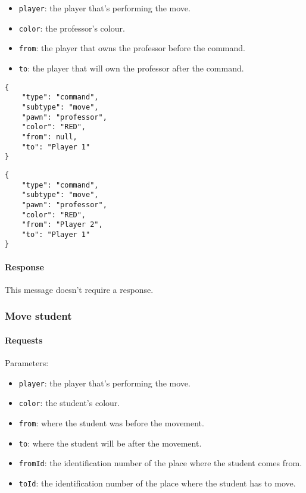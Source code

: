 \documentclass[a4paper]{article}
\begin{document}
	\begin{itemize}
		\item \verb|player|: the player that's performing the move.
		\item \verb|color|: the professor's colour.
		\item \verb|from|: the player that owns the professor before the command.
		\item \verb|to|: the player that will own the professor after the command.
	\end{itemize}

	\begin{multicols}{2}
		\begin{verbatim}
{
	"type": "command",
	"subtype": "move",
	"pawn": "professor",
	"color": "RED",
	"from": null,
	"to": "Player 1"
}
		\end{verbatim}

		\begin{verbatim}
{
	"type": "command",
	"subtype": "move",
	"pawn": "professor",
	"color": "RED",
	"from": "Player 2",
	"to": "Player 1"
}
		\end{verbatim}
	\end{multicols}

	\paragraph{Response} This message doesn't require a response.

	\subsubsection{Move student}

	\paragraph{Requests} Parameters:

	\begin{itemize}
		\item \verb|player|: the player that's performing the move.
		\item \verb|color|: the student's colour.
		\item \verb|from|: where the student was before the movement.
		\item \verb|to|: where the student will be after the movement.
		\item \verb|fromId|: the identification number of the place where the student comes from.
		\item \verb|toId|: the identification number of the place where the student has to move.
	\end{itemize}
\end{document}
